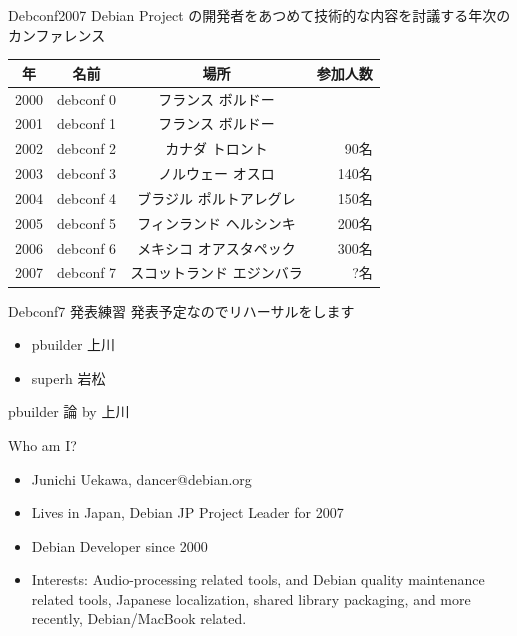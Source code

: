 \documentclass[cjk,dvipdfmx,12pt]{beamer}
\begin{document}
\begin{frame}{Debconf2007}
Debian Project の開発者をあつめて技術的な内容を討議する年次のカンファレンス

 \begin{tabular}{|c|c|c|r|}
 \hline
 年 & 名前 & 場所 & 参加人数 \\
 \hline
 2000 & debconf 0 &フランス ボルドー & \\
 2001 & debconf 1 &フランス ボルドー & \\
 2002 & debconf 2 &カナダ トロント & 90名 \\
 2003 & debconf 3 &ノルウェー オスロ & 140名 \\
 2004 & debconf 4 &ブラジル ポルトアレグレ &  150名 \\
 2005 & debconf 5 &フィンランド ヘルシンキ & 200名 \\
 2006 & debconf 6 &メキシコ オアスタペック & 300名 \\
 2007 & debconf 7 &スコットランド エジンバラ & ?名 \\
 \hline
 \end{tabular}
\end{frame}
\begin{frame}{Debconf7 発表練習}
 発表予定なのでリハーサルをします
 \begin{itemize}
  \item pbuilder  上川
  \item superh  岩松
 \end{itemize}
\end{frame}

\begin{frame}{}

pbuilder 論 by 上川
\end{frame}

\begin{frame}{Who am I?}
\begin{itemize}
 \item Junichi Uekawa, dancer@debian.org
 \item Lives in Japan, Debian JP Project Leader for 2007
 \item Debian Developer since 2000
 \item Interests: Audio-processing related tools, and 
       Debian quality maintenance related tools,
       Japanese localization, shared library packaging, 
       and more recently, Debian/MacBook related.
\end{itemize}
 
\end{frame}
\end{document}
